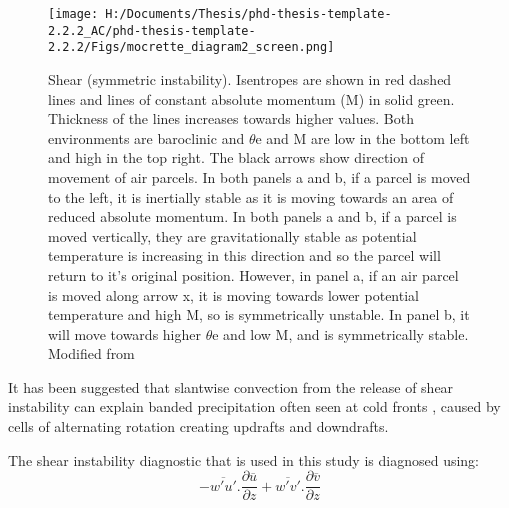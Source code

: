 \begin{figure}
	\centering	
	\texttt{[image: H:/Documents/Thesis/phd-thesis-template-2.2.2\_AC/phd-thesis-template-2.2.2/Figs/mocrette\_diagram2\_screen.png]}
	\caption{Shear (symmetric instability). Isentropes are shown in red dashed lines and lines of constant absolute momentum (M) in solid green. Thickness of the lines increases towards  higher values. Both environments are baroclinic and $\theta$e and M are low in the bottom left and high in the top right. The black arrows show direction of movement of air parcels. In both panels a and b, if a parcel is moved to the left, it is inertially stable as it is moving towards an area of reduced absolute momentum. In both panels a and b, if a parcel is moved vertically, they are gravitationally stable as potential temperature is increasing in this direction and so the parcel will return to it's original position. However, in panel a, if an air parcel is moved along arrow x, it is moving towards lower potential temperature and high M, so is symmetrically unstable. In panel b, it will move towards higher $\theta$e and low M, and is symmetrically stable. Modified from \cite{morcrette2004radar}}\label{fig:symm_inst}
\end{figure}


%	

It has been suggested that slantwise convection from the release of shear instability can explain banded precipitation often seen at cold fronts \citep{bennetts1979conditional, seltzer1985possible}, caused by cells of alternating rotation creating updrafts and downdrafts.

The shear instability diagnostic that is used in this study is diagnosed using:
\begin{equation} \label{eq_diag}
-\overline{w'u'} . \frac{\partial{\overline u}}{\partial z} + \overline{w'v'} . \frac{\partial{\overline v}}{\partial z}
\end{equation}

